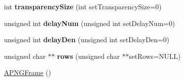 \begin{DoxyCompactItemize}
\item 
\hypertarget{classapngasm_1_1APNGFrame_adb569119e5de304fd914a426b8eb8344}{int {\bfseries transparency\-Size} (int set\-Transparency\-Size=0)}\label{classapngasm_1_1APNGFrame_adb569119e5de304fd914a426b8eb8344}

\item 
\hypertarget{classapngasm_1_1APNGFrame_a43419897a5e90845a9b861b1bc2b0a00}{unsigned int {\bfseries delay\-Num} (unsigned int set\-Delay\-Num=0)}\label{classapngasm_1_1APNGFrame_a43419897a5e90845a9b861b1bc2b0a00}

\item 
\hypertarget{classapngasm_1_1APNGFrame_a10536e9d54229720b5bce2d61547a1b0}{unsigned int {\bfseries delay\-Den} (unsigned int set\-Delay\-Den=0)}\label{classapngasm_1_1APNGFrame_a10536e9d54229720b5bce2d61547a1b0}

\item 
\hypertarget{classapngasm_1_1APNGFrame_a690460ddd31f4b2a199153ba850b6f6f}{unsigned char $\ast$$\ast$ {\bfseries rows} (unsigned char $\ast$$\ast$set\-Rows=N\-U\-L\-L)}\label{classapngasm_1_1APNGFrame_a690460ddd31f4b2a199153ba850b6f6f}

\item 
\hypertarget{classapngasm_1_1APNGFrame_a93df68fa5e073674985660412742d1f9}{\hyperlink{classapngasm_1_1APNGFrame_a93df68fa5e073674985660412742d1f9}{A\-P\-N\-G\-Frame} ()}\label{classapngasm_1_1APNGFrame_a93df68fa5e073674985660412742d1f9}


\end{DoxyCompactItemize}
